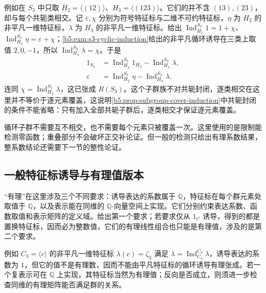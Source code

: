 例如在 \(S_3\) 中只取 \(H_2=\langle(12)\rangle\)、\(H_3=\langle(123)\rangle\)。它们的并不含 \((13),(23)\)，却与每个共轭类相交。记 \(\varepsilon,\chi\) 分别为符号特征标与二维不可约特征标，\(\eta\) 为 \(H_2\) 的非平凡一维特征标，\(\lambda\) 为 \(H_3\) 的非平凡一维特征标。给出 \(\operatorname{Ind}_{H_2}^{S_3}1=1+\chi\)、\(\operatorname{Ind}_{H_2}^{S_3}\eta=\varepsilon+\chi\)；\cref{b5:exm:s3-cyclic-induction}给出的非平凡循环诱导在三类上取值 \(2,0,-1\)，所以 \(\operatorname{Ind}_{H_3}^{S_3}\lambda=\chi\)。于是
\[
	\begin{aligned}
		1_{S_3}&=\operatorname{Ind}_{H_2}^{S_3}1_{H_2} -\operatorname{Ind}_{H_3}^{S_3}\lambda,
		\\
		\varepsilon&=\operatorname{Ind}_{H_2}^{S_3}\eta -\operatorname{Ind}_{H_3}^{S_3}\lambda.
	\end{aligned}
\]
连同 \(\chi=\operatorname{Ind}_{H_3}^{S_3}\lambda\)，这已张成 \(R(S_3)\)。这个子群族不对共轭封闭，逐类相交在这里并不等价于逐元素覆盖，这说明\cref{b5:prop:subgroup-cover-induction}中共轭封闭的条件不能省略：只有加入全部共轭子群后，逐类相交才保证逐元素覆盖。

\ProseParagraphBreak
循环子群不需要互不相交，也不需要每个元素只被覆盖一次。这里使用的是限制能检测零函数；重叠部分不会破坏正交补论证。但一般的检测只给出有理系数结果，整系数结论还需要下一节的整性论证。

\subsection{一般特征标诱导与有理值版本}
\label{b5:subsec:0502:04}

“有理”在这里涉及三个不同要求：诱导表达的系数属于 \(\mathbb Q\)，特征标在每个群元素处取值于 \(\mathbb Q\)，以及表示能在同维的 \(\mathbb Q\)-向量空间上实现。它们分别约束表达系数、函数取值和表示矩阵的定义域。给出第一个要求；若要求仅从 \(1_C\) 诱导，得到的都是置换特征标，因而必为整数值，它们的有理线性组合也只能是有理值，涉及的是第二个要求。

\ProseParagraphBreak
例如 \(C_3=\langle c\rangle\) 的非平凡一维特征标 \(\lambda(c)=\zeta_3\) 满足 \(\lambda=\operatorname{Ind}_{C_3}^{C_3}\lambda\)，诱导表达的系数为 \(1\)，但它的值不是有理数，因而不能由平凡特征标的循环诱导有理张成。若一个复表示可在 \(\mathbb Q\) 上实现，其特征标当然为有理值；反向是否成立，则须进一步检查同维的有理矩阵能否满足群的关系。

